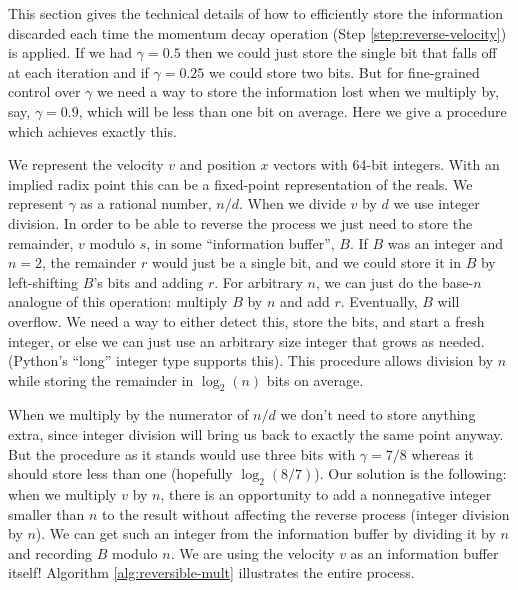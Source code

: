 \documentclass{article}
\newcommand{\decay}{\gamma}
\begin{document}
This section gives the technical details of how to efficiently store the information discarded each time the momentum decay
operation (Step \ref{step:reverse-velocity}) is applied.
If we had $\decay = 0.5$ then we could just store the
single bit that falls off at each iteration and if $\decay = 0.25$ we could
store two bits. But for fine-grained control over $\decay$ we need a way to store the information lost when we multiply by, say, $\decay = 0.9$, which will be less than one bit on average. Here we give a procedure which achieves exactly
this.

We represent the velocity $v$ and position $x$ vectors with 64-bit integers. With an implied radix point this can be a fixed-point
representation of the reals. We represent $\decay$ as a rational number,
$n/d$. When we divide $v$ by $d$ we use integer division. In order to be able to
reverse the process we just need to store the remainder, $v$ modulo $s$, in some
``information buffer'', $B$. If $B$ was an integer and $n = 2$, the remainder $r$ would just be a single bit, and we could store it in $B$ by left-shifting $B$'s bits and adding $r$. For arbitrary $n$, we can just do the base-$n$ analogue of this operation: multiply $B$ by $n$ and add $r$. Eventually, $B$ will overflow. We need a way to either detect
this, store the bits, and start a fresh integer, or else we can just use an
arbitrary size integer that grows as needed. (Python's ``long'' integer type
supports this). This procedure allows division by $n$ while storing the
remainder in $\log_2(n)$ bits on average.

When we multiply by the numerator of $n/d$ we don't need to store anything
extra, since integer division will bring us back to exactly the same point
anyway. But the procedure as it stands would use three bits with $\decay = 7/8$
whereas it should store less than one (hopefully $\log_2 (8/7)$). Our solution is the following: when we multiply $v$ by $n$, there is an opportunity to add a
nonnegative integer smaller than $n$ to the result without affecting the reverse
process (integer division by $n$). We can get such an integer from the
information buffer by dividing it by $n$ and recording $B$ modulo $n$. We are using
the velocity $v$ as an information buffer itself! Algorithm
\ref{alg:reversible-mult} illustrates the entire process.
\end{document}
